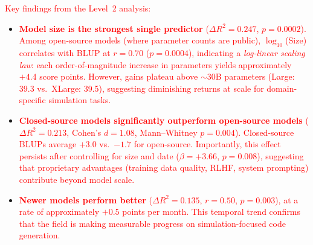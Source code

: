 \documentclass{ieeeaccess}
\newcommand{\updatedText}[1]{\textcolor{red}{#1}}
\begin{document}
\begin{table}[htbp]
\centering
\updatedText{\caption{Level~2 sequential OLS on model BLUPs.
$\Delta R^2$: incremental variance of between-model differences
explained.  All predictors are standardized for coefficient comparability.}\label{tab:level2}}
\end{table}

\updatedText{Key findings from the Level~2 analysis:}
\begin{itemize}
    \item \updatedText{\textbf{Model size is the strongest single predictor}
    ($\Delta R^2 = 0.247$, $p = 0.0002$).  Among open-source models
    (where parameter counts are public), $\log_{10}$(Size) correlates with
    BLUP at $r = 0.70$ ($p = 0.0004$), indicating a \emph{log-linear
    scaling law}: each order-of-magnitude increase in parameters yields
    approximately $+4.4$ score points.  However, gains plateau above
    ${\sim}30$B parameters (Large: 39.3 vs.\ XLarge: 39.5), suggesting
    diminishing returns at scale for domain-specific simulation tasks.}
    
    \item \updatedText{\textbf{Closed-source models significantly outperform
    open-source models} ($\Delta R^2 = 0.213$, Cohen's $d = 1.08$,
    Mann--Whitney $p = 0.004$).  Closed-source BLUPs average $+3.0$
    vs.\ $-1.7$ for open-source.  Importantly, this effect persists
    after controlling for size and date ($\beta = +3.66$, $p = 0.008$),
    suggesting that proprietary advantages (training data quality, RLHF,
    system prompting) contribute beyond model scale.}
    
    \item \updatedText{\textbf{Newer models perform better}
    ($\Delta R^2 = 0.135$, $r = 0.50$, $p = 0.003$), at a rate of
    approximately $+0.5$ points per month.  This temporal trend confirms
    that the field is making measurable progress on simulation-focused
    code generation.}
\end{itemize}
\end{document}

